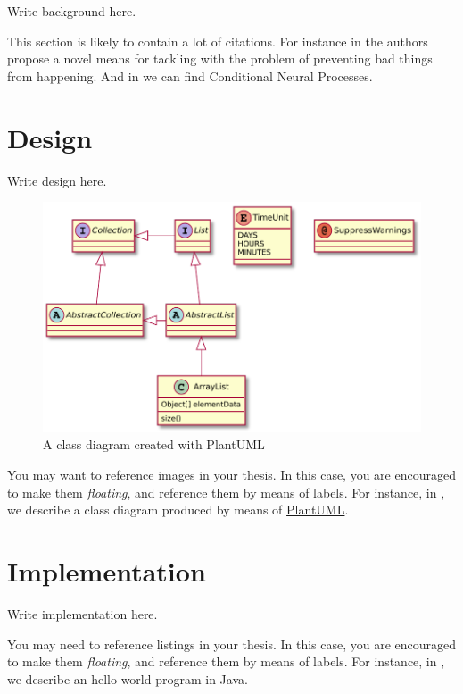 \documentclass[12pt,a4paper,openright,twoside]{book}
\begin{document}
Write background here.

This section is likely to contain a lot of citations.
%
For instance in \cite{Ugur-RSS-19} the authors propose a novel means for tackling with the problem of preventing bad things from happening. And in \cite{DBLP:journals/corr/abs-1807-01613} we can find Conditional Neural Processes.

\chapter{Design} %
\label{chap:design}

Write design here.

\begin{figure}
	\centering
	\includegraphics[width=0.5\linewidth]{figures/classes.pdf}
	\caption{A class diagram created with PlantUML}
	\label{fig:classes}
\end{figure}

You may want to reference images in your thesis.
%
In this case, you are encouraged to make them \emph{floating}, and reference them by means of labels.
%
For instance, in , we describe a class diagram produced by means of \href{http://plantuml.com}{PlantUML}.

\chapter{Implementation} %
\label{chap:implementation}

Write implementation here.


You may need to reference listings in your thesis.
%
In this case, you are encouraged to make them \emph{floating}, and reference them by means of labels.
%
For instance, in , we describe an hello world program in Java.
\end{document}
